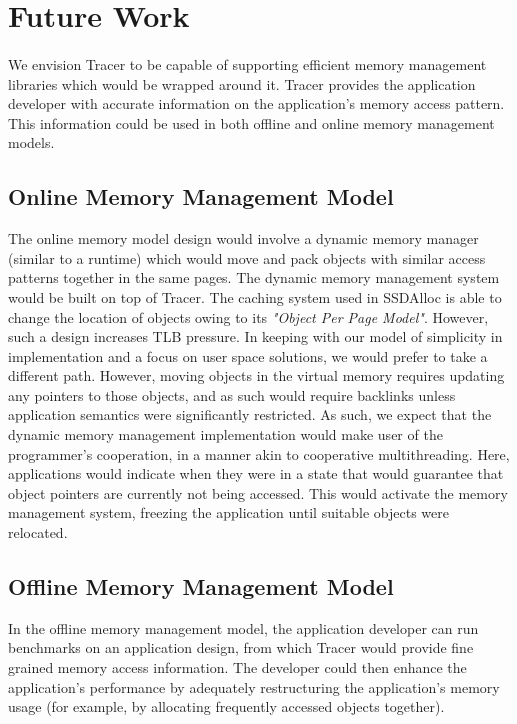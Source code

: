 \section{Future Work}
\label{sec:futurework}
\paragraph{}
We envision Tracer to be capable of supporting efficient memory management libraries which would be wrapped around it. Tracer provides the application developer with accurate information on the application's memory access pattern. This information could be used in both offline and online memory management models.

\subsection{Online Memory Management Model}
The online memory model design would involve a dynamic memory manager (similar to a runtime) which would move and pack objects with similar access patterns together in the same pages. The dynamic memory management system would be built on top of Tracer. The caching system used in SSDAlloc is able to change the location of objects owing to its {\emph{"Object Per Page Model"}}. However, such a design increases TLB pressure. In keeping with our model of simplicity in implementation and a focus on user space solutions, we would prefer to take a different path. However, moving objects in the virtual memory requires updating any pointers to those objects, and as such would require backlinks unless application semantics were significantly restricted. As such, we expect that the dynamic memory management implementation would make user of the programmer's cooperation, in a manner akin to cooperative multithreading. Here, applications would indicate when they were in a state that would guarantee that object pointers are currently not being accessed. This would activate the memory management system, freezing the application until suitable objects were relocated.

\subsection{Offline Memory Management Model}
In the offline memory management model, the application developer can run benchmarks on an application design, from which Tracer would provide fine grained memory access information. The developer could then enhance the application's performance by adequately restructuring the application's memory usage (for example, by allocating frequently accessed objects together).

